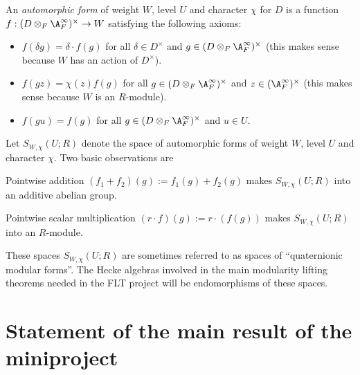 \begin{definition}
  \label{TotallyDefiniteQuaternionAlgebra.AutomorphicForm}
  \leanok
  An \emph{automorphic form} of weight $W$, level $U$ and character $\chi$ for $D$ is
  a function $f:(D\otimes_F\A_F^\infty)^\times\to W$ satisfying the following axioms:
  \begin{itemize}
    \item $f(\delta g)=\delta\cdot f(g)$ for all $\delta\in D^\times$ and $g\in (D\otimes_F\A_F^\infty)^\times$
    (this makes sense because $W$ has an action of $D^\times$).
    \item $f(gz)=\chi(z)f(g)$ for all $g\in (D\otimes_F\A_F^\infty)^\times$ and $z\in(\A_F^\infty)^\times$
    (this makes sense because $W$ is an $R$-module).
    \item $f(gu)=f(g)$ for all $g\in (D\otimes_F\A_F^\infty)^\times$ and $u\in U$.
  \end{itemize}
\end{definition}

Let $S_{W,\chi}(U;R)$ denote the space of automorphic forms of weight $W$, level $U$ and character
$\chi$. Two basic observations are

\begin{definition}
  \label{TotallyDefiniteQuaternionAlgebra.AutomorphicForm.addCommGroup}
  \leanok
  Pointwise addition $(f_1+f_2)(g):=f_1(g)+f_2(g)$ makes $S_{W,\chi}(U;R)$ into an additive
  abelian group.
\end{definition}

\begin{definition}
  \label{TotallyDefiniteQuaternionAlgebra.AutomorphicForm.module}
  \leanok
  Pointwise scalar multiplication $(r\cdot f)(g):= r\cdot(f(g))$ makes
  $S_{W,\chi}(U;R)$ into an $R$-module.
\end{definition}

These spaces $S_{W,\chi}(U;R)$ are sometimes referred to as spaces of ``quaternionic modular forms''.
The Hecke algebras involved in the main modularity lifting theorems needed in the FLT project
will be endomorphisms of these spaces.

\section{Statement of the main result of the miniproject}

